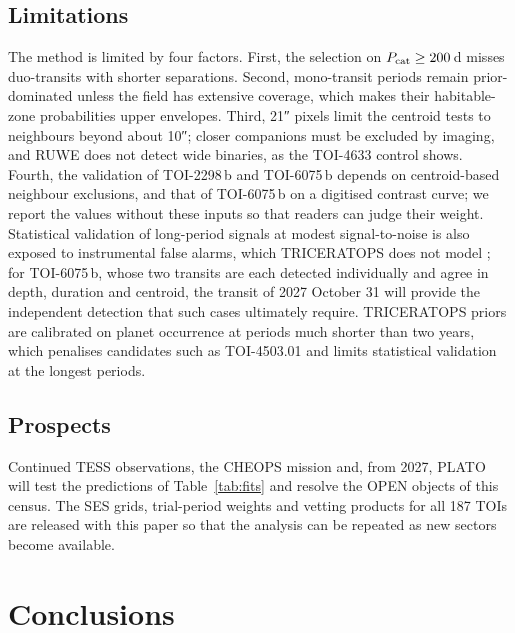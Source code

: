 \documentclass[fleqn,usenatbib]{mnras}
\newcommand{\Pcat}{\ensuremath{P_{\rm cat}}}
\begin{document}
\subsection{Limitations}

The method is limited by four factors. First, the selection on $\Pcat \geq 200$\,d misses duo-transits with shorter separations. Second, mono-transit periods remain prior-dominated unless the field has extensive coverage, which makes their habitable-zone probabilities upper envelopes. Third, 21″ pixels limit the centroid tests to neighbours beyond about 10″; closer companions must be excluded by imaging, and RUWE does not detect wide binaries, as the TOI-4633 control shows. Fourth, the validation of TOI-2298\,b and TOI-6075\,b depends on centroid-based neighbour exclusions, and that of TOI-6075\,b on a digitised contrast curve; we report the values without these inputs so that readers can judge their weight. Statistical validation of long-period signals at modest signal-to-noise is also exposed to instrumental false alarms, which TRICERATOPS does not model \citep{Mullally2018}; for TOI-6075\,b, whose two transits are each detected individually and agree in depth, duration and centroid, the transit of 2027 October 31 will provide the independent detection that such cases ultimately require. TRICERATOPS priors are calibrated on planet occurrence at periods much shorter than two years, which penalises candidates such as TOI-4503.01 and limits statistical validation at the longest periods.

\subsection{Prospects}

Continued TESS observations, the CHEOPS mission and, from 2027, PLATO will test the predictions of Table~\ref{tab:fits} and resolve the OPEN objects of this census. The SES grids, trial-period weights and vetting products for all 187 TOIs are released with this paper so that the analysis can be repeated as new sectors become available.

\section{Conclusions}
\end{document}
